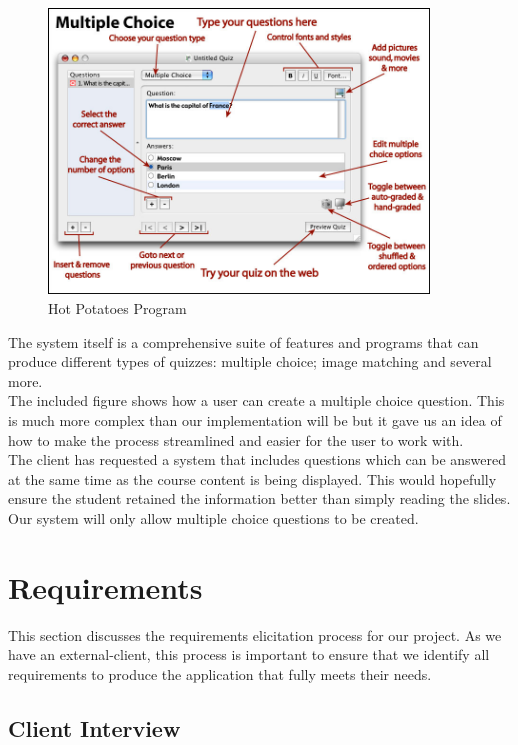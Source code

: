 \documentclass{l3proj}
\begin{document}
\begin{figure}[!htb]
\caption{Hot Potatoes Program}
 \centering
\includegraphics[width=0.9\textwidth]{images/HotPotatoes/HotPotatoesQuestion.jpg}
\end{figure}

The system itself is a comprehensive suite of features and programs
that can produce different types of quizzes: multiple choice; image
matching and several more.\\

The included figure shows how a user can create a multiple choice question. This is much more complex than our implementation will be but it gave us an idea of how to make the process streamlined and easier for the user to work with.\\ 

The client has requested a system that includes questions which can be
answered at the same time as the course content is being
displayed. This would hopefully ensure the student retained the
information better than simply reading the slides. Our system will
only allow multiple choice questions to be created.

\chapter{Requirements}
\label{req}

This section discusses the requirements elicitation process for our project. As we have an external-client, this process is important to ensure that we identify all requirements to produce the application that fully meets their needs.

\section{Client Interview}
\end{document}
